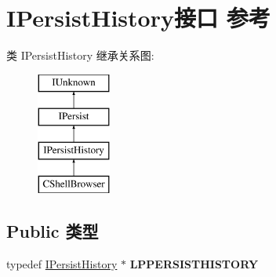 \hypertarget{interface_i_persist_history}{}\section{I\+Persist\+History接口 参考}
\label{interface_i_persist_history}
类 I\+Persist\+History 继承关系图\+:\begin{figure}[H]
\begin{center}
\leavevmode
\includegraphics[height=4.000000cm]{interface_i_persist_history}
\end{center}
\end{figure}
\subsection*{Public 类型}
\begin{DoxyCompactItemize}
\item 
\mbox{\label{interface_i_persist_history_ac121f6c16892c657aad625fae36a7e58}} 
typedef \hyperlink{interface_i_persist_history}{I\+Persist\+History} $\ast$ {\bfseries L\+P\+P\+E\+R\+S\+I\+S\+T\+H\+I\+S\+T\+O\+RY}
\end{DoxyCompactItemize}
